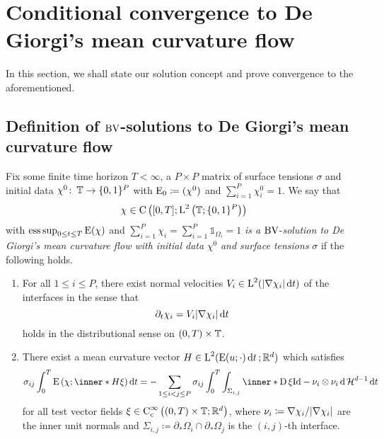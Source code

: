 \section{Conditional convergence to De Giorgi's mean curvature flow}

In this section, we shall state our solution concept and prove convergence to 
the aforementioned.

\subsection{Definition of $ \operatorname{BV} $-solutions to De Giorgi's mean curvature flow}

\begin{definition}
	\label{de_giorgi_solution_to_mmcf}
	Fix some finite time horizon $ T < \infty $, a $ P \times P $ matrix of 
	surface tensions $ \sigma $ and initial data $ \chi^{ 0 } \colon \operatorname{\mathbb{T}} 
	\to \{ 0 , 1 \}^{ P } $ with $ \operatorname{E}_{ 0 } \coloneqq ( \chi^{ 0 } ) $ and 
	$ \sum_{ i = 1 }^{ P } \chi_{ i }^{ 0 } = 1 $. We say that
	\begin{equation*}
		\chi \in \operatorname{C} \left(
		[ 0 , T ]
		;
		\operatorname{L}^{ 2 } \left( \operatorname{\mathbb{T}} ; \{ 0 , 1 \}^{ P } \right)
		\right)
	\end{equation*}
	with $ \operatorname*{ess\,sup}_{ 0 \leq t \leq T } \operatorname{E} ( \chi ) $ and $ \sum_{ i = 1 
	}^{ P } \chi_{ i } = \sum_{ i = 1 }^{ P } \mathds{ 1 }_{ \Omega_{ i } } = 
	1  $ \emph{is a } $\operatorname{BV}$-\emph{solution to De Giorgi's mean 
	curvature flow with initial data} $ \chi^{ 0 } $ \emph{and surface 
	tensions} $ \sigma $ if the following holds. 
	\begin{enumerate}
		\item 
		For all $ 1 \leq i \leq P $, there exist normal 
		velocities $ V_{ i } \in \operatorname{L}^{ 2 } ( \abs{ \nabla \chi_{ i } } \dd{ t } 
		) $ 
		of the interfaces 
		in the sense that
		\begin{equation*}
			\partial_{ t } \chi_{ i }
			=
			V_{ i } \abs{ \nabla \chi_{ i } } \dd{ t }
		\end{equation*}
		holds in the distributional sense on $ ( 0 , T ) \times \operatorname{\mathbb{T}} $.
		
		\item 
		There exist a mean curvature vector $ H \in 
		\operatorname{L}^{ 2 } ( \operatorname{E} ( u ; \cdot) \dd{ t } ; \mathbb{ R }^{ d } ) $ 
		which satisfies
		\begin{equation*}
			\sigma_{ i j }
			\int_{ 0 }^{ T }
				\energy \left( \chi ; \inner*{ H }{ \xi } \right)
			\dd{ t }
			=
			-
			\sum_{ 1 \leq i < j \leq P }
			\sigma_{ i j }
			\int_{ 0 }^{ T }
				\int_{ \Sigma_{ i , j } }
					\inner*{
						\diff \xi }
					{ \mathrm{Id} - \nu_{ i } \otimes \nu_{ i } }
				\dd{ \hm^{ d - 1 } }
			\dd{ t }
		\end{equation*}
		for all test vector fields 
		$ \xi \in \operatorname{C}_{ \mathrm{c} }^{ \infty } \left(
			( 0 , T ) \times \operatorname{\mathbb{T}} ; \mathbb{ R }^{ d }
		\right) $,
		where $ \nu_{ i } \coloneqq \nabla \chi_{ i } / \abs{ \nabla \chi_{ i } 
		} $ are the inner unit normals and $ \Sigma_{ i , j } \coloneqq 
		\partial_{ \ast } \Omega_{ i } \cap \partial_{ \ast } \Omega_{ j } $
		is the $ (i, j )$-th interface.
		

\end{enumerate}
\end{definition}
